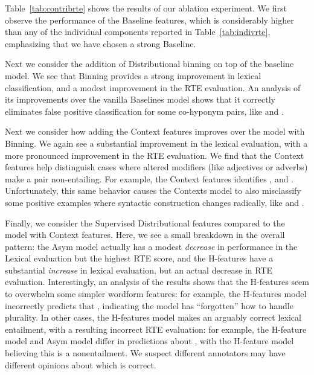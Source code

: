 Table~\ref{tab:contribrte} shows the results of our ablation experiment. We
first observe the performance of the Baseline features, which is considerably
higher than any of the individual components reported in
Table~\ref{tab:indivrte}, emphasizing that we have chosen a strong Baseline.

Next we consider the addition of Distributional binning on top of the baseline
model. We see that Binning provides a strong improvement in lexical
classification, and a modest improvement in the RTE evaluation. An analysis
of its improvements over the vanilla Baselines model shows that it correctly
eliminates false positive classification for some co-hyponym pairs, like
 and .

Next we consider how adding the Context features improves over the model
with Binning. We again see a substantial improvement in the lexical evaluation,
with a more pronounced improvement in the RTE evaluation. We find that the
Context features help distinguish cases where altered modifiers (like adjectives
or adverbs) make a pair non-entailing.
For example, the Context features identifies , and . Unfortunately, this
same behavior causes the Contexts model to also misclassify
some positive examples where syntactic
construction changes radically, like  and .

Finally, we consider the Supervised Distributional features compared to the
model with Context features. Here, we see a small breakdown in the overall
pattern: the Asym model actually has a modest {\em decrease} in performance
in the Lexical evaluation but the highest RTE score, and the H-features have
a substantial {\em increase} in lexical evaluation, but an actual decrease
in RTE evaluation. Interestingly, an analysis of the results shows that the
H-features seem to overwhelm some simpler wordform features: for example,
the H-features model incorrectly predicts that ,
indicating the model has ``forgotten'' how to handle plurality. In other cases,
the H-features model makes an arguably correct lexical entailment, with
a resulting incorrect RTE evaluation: for example, the H-feature model and Asym
model differ in predictions about , with the
H-feature model believing this is a nonentailment. We suspect different
annotators may have different opinions about which is correct.

